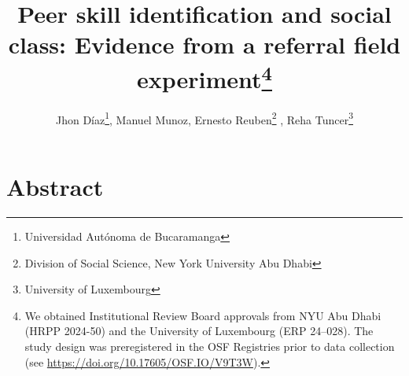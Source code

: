 \documentclass[11pt,a4paper,oneside]{article}
\title{Peer skill identification and social class:
Evidence from a referral field experiment\footnote{We obtained Institutional Review Board approvals from NYU Abu Dhabi (HRPP 2024-50) and the University of Luxembourg (ERP 24–028). The study design was preregistered in the OSF Registries prior to data collection (see \url{https://doi.org/10.17605/OSF.IO/V9T3W}).} }
\author{Jhon Díaz\footnote{Universidad Autónoma de Bucaramanga}, Manuel Munoz\footremember{liser}{Luxembourg Institute of Socio-Economic Research}, Ernesto Reuben\footnote{Division of Social Science, New York University Abu Dhabi} \footrecall{liser}, Reha Tuncer\footnote{University of Luxembourg}}
\begin{document}
\maketitle



\section*{Abstract}

\end{document}
